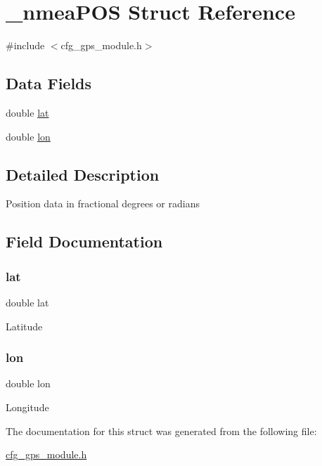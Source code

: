 \hypertarget{struct__nmea_p_o_s}{}\section{\+\_\+nmea\+P\+OS Struct Reference}
\label{struct__nmea_p_o_s}


{\ttfamily \#include $<$cfg\+\_\+gps\+\_\+module.\+h$>$}

\subsection*{Data Fields}
\begin{DoxyCompactItemize}
\item 
double \hyperlink{struct__nmea_p_o_s_a7972334534f68166121a6e51b0aac2d6}{lat}
\item 
double \hyperlink{struct__nmea_p_o_s_aa96391e04b5977c50b96d77bea86a01d}{lon}
\end{DoxyCompactItemize}


\subsection{Detailed Description}
Position data in fractional degrees or radians 

\subsection{Field Documentation}
\mbox{\label{struct__nmea_p_o_s_a7972334534f68166121a6e51b0aac2d6}} 
\subsubsection{\texorpdfstring{lat}{lat}}
{\footnotesize\ttfamily double lat}

Latitude \mbox{\label{struct__nmea_p_o_s_aa96391e04b5977c50b96d77bea86a01d}} 
\subsubsection{\texorpdfstring{lon}{lon}}
{\footnotesize\ttfamily double lon}

Longitude 

The documentation for this struct was generated from the following file\+:\begin{DoxyCompactItemize}
\item 
\hyperlink{cfg__gps__module_8h}{cfg\+\_\+gps\+\_\+module.\+h}\end{DoxyCompactItemize}

